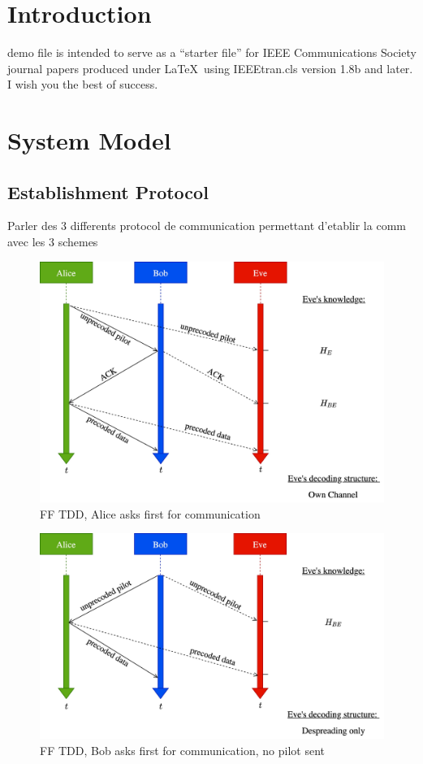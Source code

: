 \documentclass[journal,comsoc]{IEEEtran}
\let\MYoriglatexcaption\caption
\renewcommand{\caption}[2][\relax]{\MYoriglatexcaption[#2]{#2}}
\begin{document}
\section{Introduction}
 demo file is intended to serve as a ``starter file''
for IEEE Communications Society journal papers produced under \LaTeX\ using
IEEEtran.cls version 1.8b and later.
I wish you the best of success.







\section{System Model}

\subsection{Establishment Protocol}
{\color{red}Parler des 3 differents protocol de communication permettant d'etablir la comm avec les 3 schemes}

\begin{figure}[!t]
	\centering
	\includegraphics[width=.8\linewidth]{graphs/diagram_sequence-FF_TDD_A.jpg}
	\caption{FF TDD, Alice asks first for communication}
	\label{fig_ff_tdd_a}
\end{figure}

\begin{figure}[!t]
	\centering
	\includegraphics[width=.75\linewidth]{graphs/diagram_sequence-FF_TDD_B_no_pilot.jpg}
	\caption{FF TDD, Bob asks first for communication, no pilot sent}
	\label{fig_ff_tdd_b_no_pilot}
\end{figure}
\end{document}
